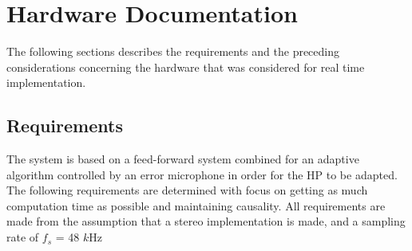 \section{Hardware Documentation}\label{sec:HardwareDocumentation}

The following sections describes the requirements and the preceding considerations concerning the hardware that was considered for real time implementation. 

\subsection{Requirements}\label{subsec:Requirements}

The system is based on a feed-forward system combined for an adaptive algorithm controlled by an error microphone in order for the HP to be adapted. The following requirements are determined with focus on getting as much computation time as possible and maintaining causality.
All requirements are made from the assumption that a stereo implementation is made, and a sampling rate of $f_{s}$ = 48 $k$Hz
